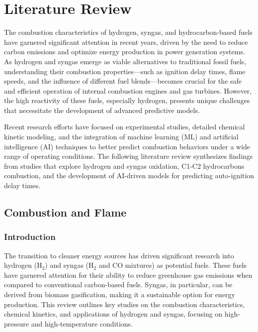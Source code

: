 \documentclass[12pt]{report}
\begin{document}
\newpage


\chapter{Literature Review}
The combustion characteristics of hydrogen, syngas, and hydrocarbon-based fuels have garnered significant attention in recent years, driven by the need to reduce carbon emissions and optimize energy production in power generation systems. As hydrogen and syngas emerge as viable alternatives to traditional fossil fuels, understanding their combustion properties—such as ignition delay times, flame speeds, and the influence of different fuel blends—becomes crucial for the safe and efficient operation of internal combustion engines and gas turbines. However, the high reactivity of these fuels, especially hydrogen, presents unique challenges that necessitate the development of advanced predictive models.

Recent research efforts have focused on experimental studies, detailed chemical kinetic modeling, and the integration of machine learning (ML) and artificial intelligence (AI) techniques to better predict combustion behaviors under a wide range of operating conditions. The following literature review synthesizes findings from studies that explore hydrogen and syngas oxidation, C1-C2 hydrocarbons combustion, and the development of AI-driven models for predicting auto-ignition delay times.


\section{Combustion and Flame}

\subsection{Introduction}
The transition to cleaner energy sources has driven significant research into hydrogen (H$_2$) and syngas (H$_2$ and CO mixtures) as potential fuels. These fuels have garnered attention for their ability to reduce greenhouse gas emissions when compared to conventional carbon-based fuels. Syngas, in particular, can be derived from biomass gasification, making it a sustainable option for energy production. This review outlines key studies on the combustion characteristics, chemical kinetics, and applications of hydrogen and syngas, focusing on high-pressure and high-temperature conditions.
\end{document}
